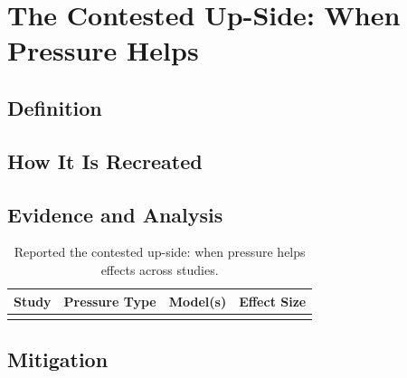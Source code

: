 \section{The Contested Up-Side: When Pressure Helps}
\label{sec:contested_upside}

\subsection{Definition}
\label{sec:contested_upside_definition}

\subsection{How It Is Recreated}
\label{sec:contested_upside_elicitation}

\subsection{Evidence and Analysis}
\label{sec:contested_upside_evidence}

\begin{table}[t]
\centering
\caption{Reported the contested up-side: when pressure helps effects across studies.}
\label{tab:contested_upside_evidence}
\begin{tabular}{llll}
\toprule
\textbf{Study} & \textbf{Pressure Type} & \textbf{Model(s)} & \textbf{Effect Size} \\
\midrule
 & & & \\
\bottomrule
\end{tabular}
\end{table}

\subsection{Mitigation}
\label{sec:contested_upside_mitigation}
